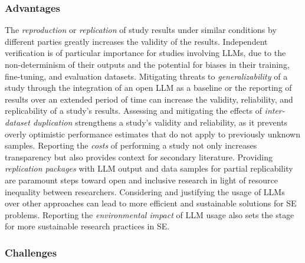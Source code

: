 \subsubsection{Advantages}

The \emph{reproduction} or \emph{replication} of study results under similar conditions by different parties greatly increases the validity of the results. %
Independent verification is of particular importance for studies involving LLMs, due to the non-determinism of their outputs and the potential for biases in their training, fine-tuning, and evaluation datasets.
Mitigating threats to \emph{generalizability} of a study through the integration of an open LLM as a baseline or the reporting of results over an extended period of time can increase the validity, reliability, and replicability of a study's results.
Assessing and mitigating the effects of \emph{inter-dataset duplication} strengthens a study's validity and reliability, as it prevents overly optimistic performance estimates that do not apply to previously unknown samples.
Reporting the \emph{costs} of performing a study not only increases transparency but also provides context for secondary literature. %
Providing \emph{replication packages} with LLM output and data samples for partial replicability are paramount steps toward open and inclusive research in light of resource inequality between researchers.
Considering and justifying the usage of LLMs over other approaches can lead to more efficient and sustainable solutions for SE problems. 
Reporting the \emph{environmental impact} of LLM usage also sets the stage for more sustainable research practices in SE.

\subsubsection{Challenges}

